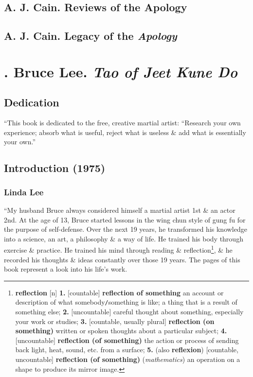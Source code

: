 \documentclass[oneside]{book}
\numberwithin{equation}{section}
\begin{document}

\section{A. J. Cain. Reviews of the Apology}


\section{A. J. Cain. Legacy of the \textit{Apology}}


\chapter{\cite{Lee2011}. Bruce Lee. \textit{Tao of Jeet Kune Do}}

\section*{Dedication}
``This book is dedicated to the free, creative martial artist: ``Research your own experience; absorb what is useful, reject what is useless \& add what is essentially your own.''

\section*{Introduction (1975)}

\subsection*{Linda Lee}
``My husband Bruce always considered himself a martial artist 1st \& an actor 2nd. At the age of 13, Bruce started lessons in the wing chun style of gung fu for the purpose of self-defense. Over the next 19 years, he transformed his knowledge into a science, an art, a philosophy \& a way of life. He trained his body through exercise \& practice. He trained his mind through reading \& reflection\footnote{\textbf{reflection} [n] \textbf{1.} [countable] \textbf{reflection of something} an account or description of what somebody\texttt{/}something is like; a thing that is a result of something else; \textbf{2.} [uncountable] careful thought about something, especially your work or studies; \textbf{3.} [countable, usually plural] \textbf{reflection (on something)} written or spoken thoughts about a particular subject; \textbf{4.} [uncountable] \textbf{reflection (of something)} the action or process of sending back light, heat, sound, etc. from a surface; \textbf{5.} (also \textbf{reflexion}) [countable, uncountable] \textbf{reflection (of something)} (\textit{mathematics}) an operation on a shape to produce its mirror image.}, \& he recorded his thoughts \& ideas constantly over those 19 years. The pages of this book represent a look into his life's work.
\end{document}

